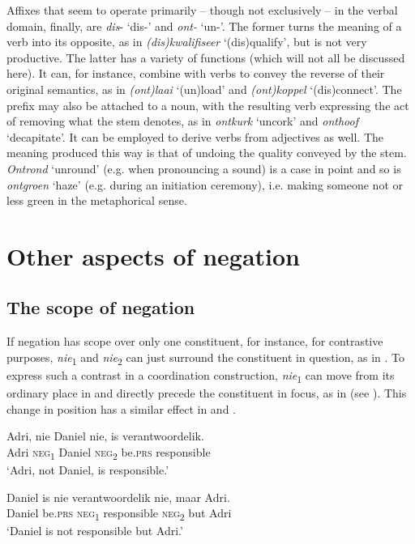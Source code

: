\documentclass[output=paper,colorlinks,citecolor=brown]{langscibook}
\begin{document}
Affixes that seem to operate primarily – though not exclusively – in the verbal domain, finally, are \textit{dis}{}- ‘dis-’ and \textit{ont-} ‘un-’. The former turns the meaning of a verb into its opposite, as in \textit{(dis)kwalifiseer} ‘(dis)qualify’, but is not very productive. The latter has a variety of functions (which will not all be discussed here). It can, for instance, combine with verbs to convey the reverse of their original semantics, as in \textit{(ont)laai} ‘(un)load’ and \textit{(ont)koppel} ‘(dis)connect’. The prefix may also be attached to a noun, with the resulting verb expressing the act of removing what the stem denotes, as in \textit{ontkurk} ‘uncork’ and \textit{onthoof} ‘decapitate’. It can be employed to derive verbs from adjectives as well. The meaning produced this way is that of undoing the quality conveyed by the stem. \textit{Ontrond} ‘unround’ (e.g. when pronouncing a sound) is a case in point and so is \textit{ontgroen} ‘haze’ (e.g. during an initiation ceremony), i.e. making someone not or less green in the metaphorical sense.

\section{Other aspects of negation}
\subsection{The scope of negation}
\label{sec:afr:4.1}
If negation has scope over only one constituent, for instance, for contrastive purposes, \textit{nie}\textsubscript{1} and \textit{nie}\textsubscript{2} can just surround the constituent in question, as in . To express such a contrast in a coordination construction, \textit{nie}\textsubscript{1} can move from its ordinary place in  and directly precede the constituent in focus, as in  (see \citealt[231--232]{Robbers1992}). This change in position has a similar effect in  and .


\ea\label{ex:afr:34}
    \ea\label{ex:afr:34a}
        \gll Adri, nie Daniel nie, is       verantwoordelik. \\ 
             Adri  \textsc{neg}\textsubscript{1} Daniel \textsc{neg}\textsubscript{2} be.\textsc{prs} responsible \\
        \glt ‘Adri, not Daniel, is responsible.’
    
    \ex\label{ex:afr:34b}
        \gll Daniel is nie verantwoordelik nie, maar Adri. \\
             Daniel be.\textsc{prs} \textsc{neg}\textsubscript{1} responsible      \textsc{neg}\textsubscript{2} but Adri\\
        \glt ‘Daniel is not responsible but Adri.’
\end{document}

